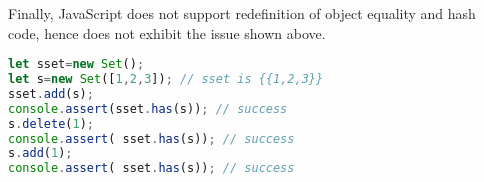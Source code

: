 Finally, JavaScript does not support redefinition of object equality and hash code, hence does not exhibit the issue shown above. 
\begin{lstlisting}[language=Javascript]
let sset=new Set();                                                           
let s=new Set([1,2,3]); // sset is {{1,2,3}}                                                         
sset.add(s);
console.assert(sset.has(s)); // success
s.delete(1);
console.assert( sset.has(s)); // success
s.add(1);
console.assert( sset.has(s)); // success
\end{lstlisting}
